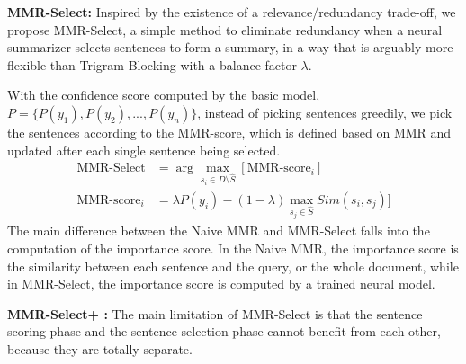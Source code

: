 \documentclass[11pt,a4paper]{article}
\begin{document}
\textbf{MMR-Select:}
Inspired by the existence of a relevance/redundancy trade-off, we propose MMR-Select, a simple method to eliminate redundancy when a neural summarizer selects sentences to form a summary, in a way that is arguably more flexible than Trigram Blocking with a balance factor $\lambda$.


 With the confidence score computed by the basic model, $P=\{P(y_1),P(y_2),...,P(y_n)\}$, instead of picking sentences greedily, we pick the sentences according to the MMR-score, which is defined based on MMR and updated after each single sentence being selected.
\vspace{-2mm}
 \begin{align*}
 \text{MMR-Select} &= \arg\max_{s_i \in D \setminus \hat{S}}[\text{MMR-score}_i]\\
\text{MMR-score}_i &= \lambda P(y_i) -(1-\lambda)\max_{s_j\in \hat{S}}Sim(s_i,s_j)]
\end{align*}
The main difference between the Naive MMR and MMR-Select falls into the computation of the importance score. In the Naive MMR, the importance score is the similarity between each sentence and the query, or the whole document, while in MMR-Select, the importance score is computed by a trained neural model. 

\textbf{MMR-Select+ :}
The main limitation of MMR-Select is that the sentence scoring phase and the sentence selection phase cannot benefit from each other, because they are totally separate.
\end{document}
